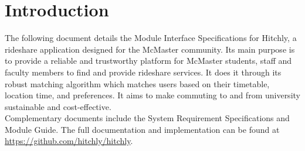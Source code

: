\section{Introduction}
The following document details the Module Interface Specifications for Hitchly, a rideshare application designed for the McMaster community. Its main purpose is to provide a reliable and trustworthy platform for McMaster students, staff and faculty members to find and provide rideshare services. It does it through its robust matching algorithm which matches users based on their timetable, location time, and preferences. It aims to make commuting to and from university sustainable and cost-effective.  
\\
Complementary documents include the System Requirement Specifications and Module Guide. The full documentation and implementation can be found at \url{https://github.com/hitchly/hitchly}. 
